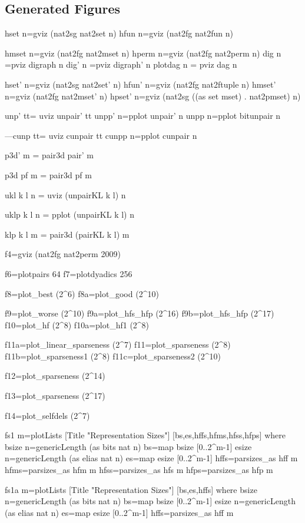 \documentclass[]{INCLUDES/llncs}
\begin{document}
\subsection*{Generated Figures}

\begin{code}
hset n=gviz  (nat2sg nat2set n)
hfun n=gviz (nat2fg nat2fun n)

hmset n=gviz (nat2fg nat2mset n)
hperm n=gviz (nat2fg nat2perm n)
dig n =pviz digraph n
dig' n =pviz digraph' n
plotdag n = pviz dag n

hset' n=gviz  (nat2sg nat2set' n)
hfun' n=gviz (nat2fg nat2ftuple n)
hmset' n=gviz (nat2fg nat2mset' n)
hpset' n=gviz (nat2sg ((as set mset) . nat2pmset) n)

unp' tt= uviz unpair' tt
unpp' n=pplot unpair' n
unpp n=pplot bitunpair n

---cunp tt= uviz cunpair tt
cunpp n=pplot cunpair n


p3d' m = pair3d pair' m 

p3d pf m = pair3d pf m 

ukl k l n = uviz (unpairKL k l) n

uklp k l n = pplot (unpairKL k l) n

klp k l m = pair3d (pairKL k l) m

f4=gviz (nat2fg nat2perm 2009)

f6=plotpairs 64
f7=plotdyadics 256

f8=plot_best (2^6)
f8a=plot_good (2^10)

f9=plot_worse (2^10)
f9a=plot_hfs_hfp (2^16)
f9b=plot_hfs_hfp (2^17)
f10=plot_hf (2^8)
f10a=plot_hf1 (2^8)

f11a=plot_linear_sparseness (2^7)
f11=plot_sparseness (2^8)
f11b=plot_sparseness1 (2^8)
f11c=plot_sparseness2 (2^10)

f12=plot_sparseness (2^14)

f13=plot_sparseness (2^17)

f14=plot_selfdels (2^7)

fs1 m=plotLists 
  [Title "Representation Sizes"] 
  [bs,es,hffs,hfms,hfss,hfps] where 
       bsize n=genericLength (as bits nat n)
       bs=map bsize [0..2^m-1]
       esize n=genericLength (as elias nat n)
       es=map esize [0..2^m-1]      
       hffs=parsizes_as hff m
       hfms=parsizes_as hfm m
       hfss=parsizes_as hfs m
       hfps=parsizes_as hfp m

fs1a m=plotLists 
  [Title "Representation Sizes"] 
  [bs,es,hffs] where 
       bsize n=genericLength (as bits nat n)
       bs=map bsize [0..2^m-1]
       esize n=genericLength (as elias nat n)
       es=map esize [0..2^m-1]
       hffs=parsizes_as hff m
 

\end{code}
\end{document}
